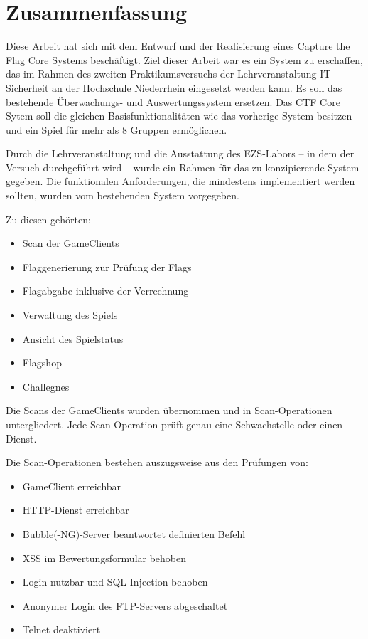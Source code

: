 \section{Zusammenfassung}
Diese Arbeit hat sich mit dem Entwurf und der Realisierung eines Capture the Flag Core Systems beschäftigt. Ziel dieser Arbeit war es ein System zu erschaffen, das im Rahmen des zweiten Praktikumsversuchs der Lehrveranstaltung IT-Sicherheit an der Hochschule Niederrhein eingesetzt werden kann. Es soll das bestehende Überwachungs- und Auswertungssystem ersetzen. Das CTF Core Sytem soll die gleichen Basisfunktionalitäten wie das vorherige System besitzen und ein Spiel für mehr als 8 Gruppen ermöglichen.

Durch die Lehrveranstaltung und die Ausstattung des EZS-Labors -- in dem der Versuch durchgeführt wird -- wurde ein Rahmen für das zu konzipierende System gegeben.
Die funktionalen Anforderungen, die mindestens implementiert werden sollten, wurden vom bestehenden System vorgegeben.

Zu diesen gehörten:
\begin{itemize}
	\item Scan der GameClients
	\item Flaggenerierung zur Prüfung der Flags
	\item Flagabgabe inklusive der Verrechnung
	\item Verwaltung des Spiels
	\item Ansicht des Spielstatus
	\item Flagshop
	\item Challegnes
\end{itemize}

Die Scans der GameClients wurden übernommen und in Scan-Operationen untergliedert. Jede Scan-Operation prüft genau eine Schwachstelle oder einen Dienst.

Die Scan-Operationen bestehen auszugsweise aus den Prüfungen von:
\begin{itemize}
	\item GameClient erreichbar
	\item HTTP-Dienst erreichbar
	\item Bubble(-NG)-Server beantwortet definierten Befehl
	\item XSS im Bewertungsformular behoben
	\item Login nutzbar und SQL-Injection behoben
	\item Anonymer Login des FTP-Servers abgeschaltet
	\item Telnet deaktiviert
\end{itemize}

